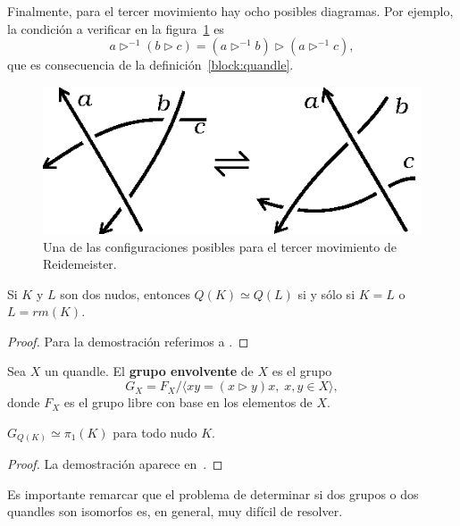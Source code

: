 \documentclass[graybox]{svmult}
\begin{document}
	Finalmente, para el tercer movimiento hay ocho posibles diagramas. Por
	ejemplo, la condición a verificar en la figura~\ref{fig:oriented_R3a} es
    \begin{equation*}
        a\triangleright^{-1}(b\triangleright c)=(a\triangleright^{-1}b)\triangleright(a\triangleright^{-1}c),
    \end{equation*}
    que es consecuencia de la definición~\ref{block:quandle}.

    \begin{figure}[h]
		\centering
        \includegraphics[scale=0.6]{images/oriented_R3a}
        \caption{Una de las configuraciones posibles para el tercer movimiento de Reidemeister.}
        \label{fig:oriented_R3a}
    \end{figure}

	\begin{theorem}[Matveev]
		Si $K$ y $L$ son dos nudos, entonces 
		$Q(K)\simeq Q(L)$ si y sólo si $K=L$ o $L=rm(K)$.  
	\end{theorem}

	\begin{proof}
	Para la demostración referimos a \cite{MR672410}.
	\end{proof}

	Sea $X$ un quandle. El \textbf{grupo envolvente} de $X$ es el grupo
	\[
		G_X=F_X/\langle xy=(x\triangleright y)x,\;x,y\in X\rangle,
	\]
	donde $F_X$ es el grupo libre con base en los elementos de $X$.

	\begin{theorem}[Joyce]
		$G_{Q(K)}\simeq\pi_1(K)$ para todo nudo $K$. 
	\end{theorem}

	\begin{proof}
		La demostración aparece en~\cite{MR638121}.
	\end{proof}

	Es importante remarcar que el problema de determinar si dos grupos o dos
	quandles son isomorfos es, en general, muy difícil de resolver.
\end{document}
